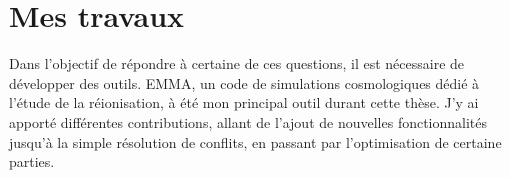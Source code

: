 %
%


\section{Mes travaux}

Dans l'objectif de répondre à certaine de ces questions, il est nécessaire de développer des outils.
EMMA, un code de simulations cosmologiques dédié à l'étude de la réionisation, à été mon principal outil durant cette thèse.
J'y ai apporté différentes contributions, allant de l'ajout de nouvelles fonctionnalités jusqu'à la simple résolution de conflits, en passant par l'optimisation de certaine parties.

